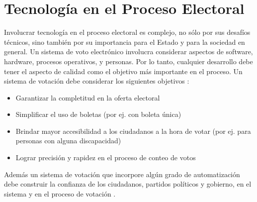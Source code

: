 \chapter{Tecnología en el Proceso Electoral}
\label{SistemaElectoral}


Involucrar tecnología en el proceso electoral es complejo, no sólo por sus desafíos técnicos, sino también por su importancia para el Estado y para la sociedad en general. Un sistema de voto electrónico involucra considerar aspectos de software, hardware, procesos operativos, y personas. Por lo tanto, cualquier desarrollo debe tener el aspecto de calidad como el objetivo más importante en el proceso.\newline
Un sistema de votación debe considerar los siguientes objetivos \cite{conicet}:
\begin{itemize}
    \item Garantizar la completitud en la oferta electoral
    \item Simplificar el uso de boletas (por ej. con boleta única)
    \item Brindar mayor accesibilidad a los ciudadanos a la hora de votar (por ej. para personas con alguna discapacidad)
    \item Lograr precisión y rapidez en el proceso de conteo de votos
\end{itemize}
Además un sistema de votación que incorpore algún grado de automatización debe construir la confianza de los ciudadanos, partidos políticos y gobierno, en el sistema y en el proceso de votación \cite{conicet}.

